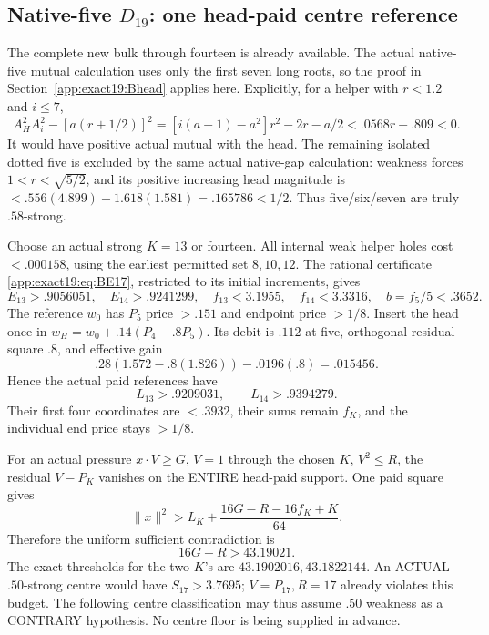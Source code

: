 \documentclass[11pt]{article}
\theoremstyle{definition}
\theoremstyle{remark}
\begin{document}
\subsection[Native-five D19: one head-paid centre reference]{Native-five \(D_{19}\): one head-paid centre reference}
\label{app:exact19:Dfivereference}

The complete new bulk through
fourteen is already available.
The actual native-five mutual
calculation uses only the first
seven long roots, so the proof
in Section~\ref{app:exact19:Bhead}
applies here.
Explicitly, for a helper with
\(r<1.2\) and \(i\le7\),
\[
 A_H^2A_i^2-[a(r+1/2)]^2
 =[i(a-1)-a^2]r^2-2r-a/2
                                <.0568r-.809<0 .
\]
It would have positive actual
mutual with the head.
The remaining isolated dotted
five is excluded by the same
actual native-gap calculation:
weakness forces
\(1<r<\sqrt{5/2}\), and its
positive increasing head
magnitude is
\(<.556(4.899)-1.618(1.581)
=.165786<1/2\).
Thus five/six/seven are truly
\(.58\)-strong.

Choose an actual strong
\(K=13\) or fourteen.
All internal weak helper holes
cost \(<.000158\), using the
earliest permitted set \(8,10,12\).
The rational certificate
\eqref{app:exact19:eq:BE17},
restricted to its initial
increments, gives
\[
 E_{13}>.9056051,\quad E_{14}>.9241299,\quad
 f_{13}<3.1955,\quad f_{14}<3.3316,\quad b=f_5/5<.3652 .
\]
The reference \(w_0\) has \(P_5\)
price \(>.151\) and endpoint
price \(>1/8\).
Insert the head once in
\(w_H=w_0+.14(P_4-.8P_5)\).
Its debit is \(.112\) at five,
orthogonal residual square \(.8\),
and effective gain
\[
                   .28(1.572-.8(1.826))-.0196(.8)=.015456 .
\]
Hence the actual paid references
have
\[
                        L_{13}>.9209031,\qquad L_{14}>.9394279 .
\]
Their first four coordinates are
\(<.3932\), their sums remain
\(f_K\), and the individual end
price stays \(>1/8\).

For an actual pressure
\(x\cdot V\ge G\), \(V=1\)
through the chosen \(K\),
\(V^2\le R\), the residual
\(V-P_K\) vanishes on the
ENTIRE head-paid support.
One paid square gives
\[
 \|x\|^2>L_K+\frac{16G-R-16f_K+K}{64}.
\tag{D19fivepay}\label{app:exact19:eq:Dfivepay}
\]
Therefore the uniform sufficient
contradiction is
\[
                              16G-R>43.19021 .
\tag{D19fivebudget}\label{app:exact19:eq:Dfivebudget}
\]
The exact thresholds for the
two \(K\)'s are
\(43.1902016,43.1822144\).
An ACTUAL \(.50\)-strong centre
would have \(S_{17}>3.7695\);
\(V=P_{17},R=17\) already
violates this budget.
The following centre classification
may thus assume \(.50\) weakness
as a CONTRARY hypothesis.
No centre floor is being supplied
in advance.
\end{document}
